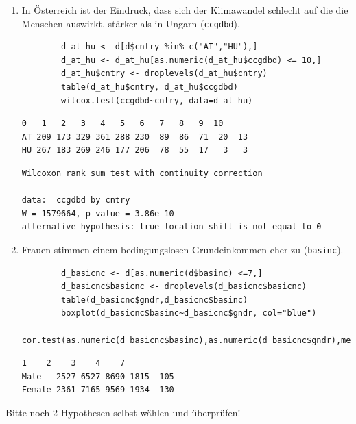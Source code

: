 \documentclass{article}
\begin{document}
\begin{enumerate}
	\item In Österreich ist der Eindruck, dass sich der Klimawandel schlecht auf die die Menschen auswirkt, stärker als in Ungarn (\texttt{ccgdbd}). 
	\begin{lstlisting}
		d_at_hu <- d[d$cntry %in% c("AT","HU"),]
		d_at_hu <- d_at_hu[as.numeric(d_at_hu$ccgdbd) <= 10,]
		d_at_hu$cntry <- droplevels(d_at_hu$cntry)
		table(d_at_hu$cntry, d_at_hu$ccgdbd)
		wilcox.test(ccgdbd~cntry, data=d_at_hu)
	\end{lstlisting}
	\begin{Verbatim}[frame=single]
     0   1   2   3   4   5   6   7   8   9  10
AT 209 173 329 361 288 230  89  86  71  20  13
HU 267 183 269 246 177 206  78  55  17   3   3
	\end{Verbatim}
	\begin{Verbatim}[frame=single]
    Wilcoxon rank sum test with continuity correction

data:  ccgdbd by cntry
W = 1579664, p-value = 3.86e-10
alternative hypothesis: true location shift is not equal to 0
	\end{Verbatim}
	\newpage
	
	\item Frauen stimmen einem bedingungslosen Grundeinkommen eher zu (\texttt{basinc}).
	\begin{lstlisting}
		d_basicnc <- d[as.numeric(d$basinc) <=7,]
		d_basicnc$basicnc <- droplevels(d_basicnc$basicnc)
		table(d_basicnc$gndr,d_basicnc$basinc)
		boxplot(d_basicnc$basinc~d_basicnc$gndr, col="blue")
		cor.test(as.numeric(d_basicnc$basinc),as.numeric(d_basicnc$gndr),method="kendall")
	\end{lstlisting}
	\begin{Verbatim}[frame=single]
          1    2    3    4    7
Male   2527 6527 8690 1815  105
Female 2361 7165 9569 1934  130
	\end{Verbatim}
\end{enumerate}
\newpage

Bitte noch 2 Hypothesen selbst wählen und überprüfen!
\end{document}
